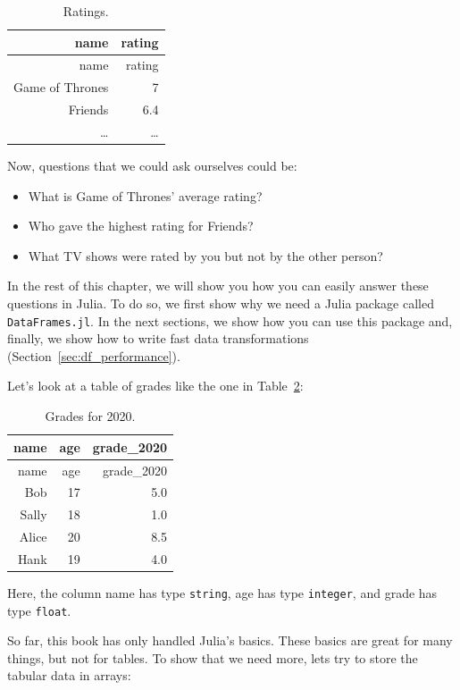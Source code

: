\documentclass[
  notoc %
]{tufte-book}
\providecommand{\tightlist}{%
  \setlength{\itemsep}{0pt}\setlength{\parskip}{0pt}
}
\newcommand{\passthrough}[1]{#1}
\begin{document}
\hypertarget{tbl:ratings}{}
\begin{longtable}[]{@{}rr@{}}
\caption{\label{tbl:ratings}Ratings.}\tabularnewline
\toprule
name & rating \\
\midrule
\endfirsthead
\toprule
name & rating \\
\midrule
\endhead
Game of Thrones & 7 \\
Friends & 6.4 \\
\ldots{} & \ldots{} \\
\bottomrule
\end{longtable}

Now, questions that we could ask ourselves could be:

\begin{itemize}
\tightlist
\item
  What is Game of Thrones' average rating?
\item
  Who gave the highest rating for Friends?
\item
  What TV shows were rated by you but not by the other person?
\end{itemize}

In the rest of this chapter, we will show you how you can easily answer
these questions in Julia. To do so, we first show why we need a Julia
package called \passthrough{\lstinline!DataFrames.jl!}. In the next
sections, we show how you can use this package and, finally, we show how
to write fast data transformations (Section~\ref{sec:df_performance}).

Let's look at a table of grades like the one in
Table~\ref{tbl:grades_for_2020}:

\hypertarget{tbl:grades_for_2020}{}
\begin{longtable}[]{@{}rrr@{}}
\caption{\label{tbl:grades_for_2020}Grades for 2020.}\tabularnewline
\toprule
name & age & grade\_2020 \\
\midrule
\endfirsthead
\toprule
name & age & grade\_2020 \\
\midrule
\endhead
Bob & 17 & 5.0 \\
Sally & 18 & 1.0 \\
Alice & 20 & 8.5 \\
Hank & 19 & 4.0 \\
\bottomrule
\end{longtable}

Here, the column name has type \passthrough{\lstinline!string!}, age has
type \passthrough{\lstinline!integer!}, and grade has type
\passthrough{\lstinline!float!}.

So far, this book has only handled Julia's basics. These basics are
great for many things, but not for tables. To show that we need more,
lets try to store the tabular data in arrays:
\end{document}
